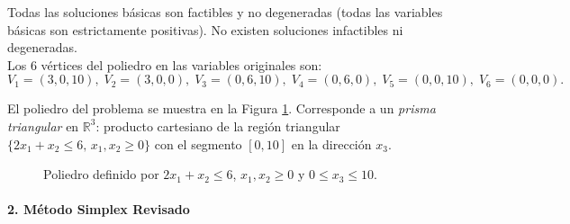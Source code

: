 Todas las soluciones básicas son factibles y no degeneradas (todas las variables básicas son estrictamente positivas). No existen soluciones infactibles ni degeneradas.\\

Los 6 vértices del poliedro en las variables originales son:
\[
  V_1=(3,0,10),\; V_2=(3,0,0),\; V_3=(0,6,10),\;
  V_4=(0,6,0),\; V_5=(0,0,10),\; V_6=(0,0,0).
\]

El poliedro del problema se muestra en la Figura \ref{ex:4:3:sol:fig:poliedro_p2}. Corresponde a un \emph{prisma triangular} en $\mathbb{R}^3$: producto cartesiano de la región triangular $\{2x_1+x_2\le 6,\,x_1,x_2\ge 0\}$ con el
segmento $[0,10]$ en la dirección $x_3$.\\

\begin{figure}[ht]
\centering
{}
\caption{Poliedro definido por $2x_1+x_2\leq 6$, $x_1,x_2\geq 0$ y $0\leq x_3\leq 10$.}
\label{ex:4:3:sol:fig:poliedro_p2}
\end{figure}

\paragraph{2.\; Método Simplex Revisado}

